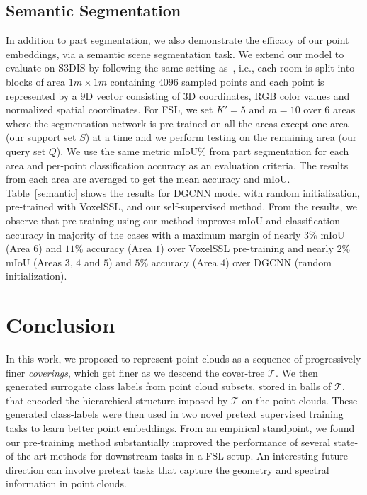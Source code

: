\documentclass{article}
\newcommand{\mT}{\mathcal{T}}
\begin{document}
\subsection{Semantic Segmentation}
In addition to part segmentation, we also demonstrate the efficacy of our point embeddings, via a semantic scene segmentation task. We extend our model to evaluate on S3DIS by following the same setting as~\cite{qi2017pointnet}, i.e., each room is split into blocks of area $1m \times 1m$ containing $4096$ sampled points and each point is represented by a $9$D vector consisting of $3$D coordinates, RGB color values and normalized spatial coordinates. For FSL, we set $K'=5$ and $m=10$ over $6$ areas where the segmentation network is pre-trained on all the areas except one area (our support set $S$) at a time and we perform testing on the remaining area (our query set $Q$). We use the same metric mIoU\% from part segmentation for each area and per-point classification accuracy as an evaluation criteria. The results from each area are averaged to get the mean accuracy and mIoU. Table~\ref{semantic} shows the results for DGCNN model with random initialization, pre-trained with VoxelSSL, and our self-supervised method. From the results, we observe that pre-training using our method improves mIoU and classification accuracy in majority of the cases with a maximum margin of nearly $3\%$ mIoU (Area $6$) and $11\%$ accuracy (Area $1$) over VoxelSSL pre-training and nearly $2\%$ mIoU (Areas $3$, $4$ and $5$) and $5\%$ accuracy (Area $4$) over DGCNN (random initialization).



\section{Conclusion}
In this work, we proposed to represent point clouds as a sequence of progressively finer \emph{coverings}, which get finer as we descend the cover-tree $\mT$. 
We then generated surrogate class labels from point cloud subsets, stored in balls of $\mT$, that encoded the hierarchical structure imposed by $\mT$ on the point clouds. These generated class-labels were then used in two novel pretext supervised training tasks to learn better point embeddings. 
From an empirical standpoint, we found our pre-training method substantially improved the performance of several state-of-the-art methods for downstream tasks in a FSL setup.
An interesting future direction can involve pretext tasks that capture the geometry and spectral information in point clouds.
\clearpage
\medskip
\end{document}

